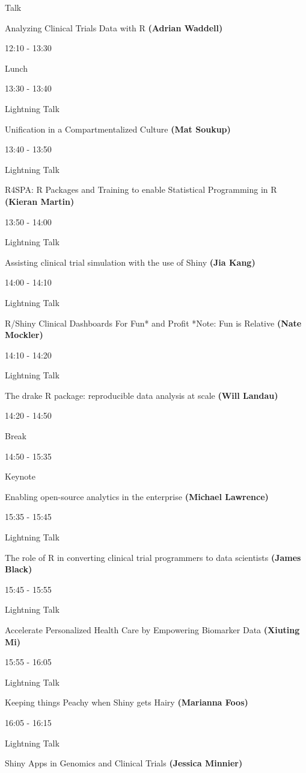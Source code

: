 \documentclass[]{book}
\theoremstyle{definition}
\theoremstyle{definition}
\theoremstyle{definition}
\theoremstyle{remark}
\begin{document}
Talk

Analyzing Clinical Trials Data with R \textbf{(Adrian Waddell)}

12:10 - 13:30

Lunch

13:30 - 13:40

Lightning Talk

Unification in a Compartmentalized Culture \textbf{(Mat Soukup)}

13:40 - 13:50

Lightning Talk

R4SPA: R Packages and Training to enable Statistical Programming in R
\textbf{(Kieran Martin)}

13:50 - 14:00

Lightning Talk

Assisting clinical trial simulation with the use of Shiny \textbf{(Jia
Kang)}

14:00 - 14:10

Lightning Talk

R/Shiny Clinical Dashboards For Fun* and Profit *Note: Fun is Relative
\textbf{(Nate Mockler)}

14:10 - 14:20

Lightning Talk

The drake R package: reproducible data analysis at scale \textbf{(Will
Landau)}

14:20 - 14:50

Break

14:50 - 15:35

Keynote

Enabling open-source analytics in the enterprise \textbf{(Michael
Lawrence)}

15:35 - 15:45

Lightning Talk

The role of R in converting clinical trial programmers to data
scientists \textbf{(James Black)}

15:45 - 15:55

Lightning Talk

Accelerate Personalized Health Care by Empowering Biomarker Data
\textbf{(Xiuting Mi)}

15:55 - 16:05

Lightning Talk

Keeping things Peachy when Shiny gets Hairy \textbf{(Marianna Foos)}

16:05 - 16:15

Lightning Talk

Shiny Apps in Genomics and Clinical Trials \textbf{(Jessica Minnier)}
\end{document}
